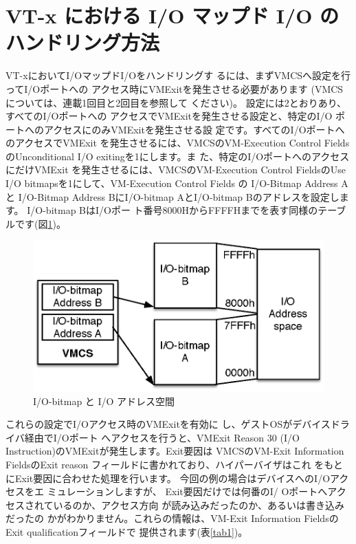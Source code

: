 \section{VT-x における I/O マップド I/O のハンドリング方法}

 VT-xにおいてI/OマップドI/Oをハンドリングす
るには、まずVMCSへ設定を行ってI/Oポートへの
アクセス時にVMExitを発生させる必要があります
(VMCSについては、連載1回目と2回目を参照して
ください)。
 設定には2とおりあり、すべてのI/Oポートへの
アクセスでVMExitを発生させる設定と、特定のI/O
ポートへのアクセスにのみVMExitを発生させる設
定です。すべてのI/OポートへのアクセスでVMExit
を発生させるには、VMCSのVM-Execution Control
FieldsのUnconditional I/O exitingを1にします。ま
た、特定のI/OポートへのアクセスにだけVMExit
を発生させるには、VMCSのVM-Execution Control
FieldsのUse I/O bitmapsを1にして、VM-Execution
Control Fields の I/O-Bitmap Address A と
I/O-Bitmap Address BにI/O-bitmap AとI/O-bitmap
Bのアドレスを設定します。 I/O-bitmap BはI/Oポー
ト番号8000HからFFFFHまでを表す同様のテーブルです(図\ref{fig1})。

\begin{figure}\centering
\includegraphics{figures/part3_fig1_IO_bitmaps.eps}
\caption{I/O-bitmap と I/O アドレス空間}
\label{fig1}
\end{figure}

 これらの設定でI/Oアクセス時のVMExitを有効に
し、ゲストOSがデバイスドライバ経由でI/Oポート
へアクセスを行うと、VMExit Reason 30 (I/O
Instruction)のVMExitが発生します。Exit要因は
VMCSのVM-Exit Information FieldsのExit reason
フィールドに書かれており、ハイパーバイザはこれ
をもとにExit要因に合わせた処理を行います。
 今回の例の場合はデバイスへのI/Oアクセスをエ
ミュレーションしますが、 Exit要因だけでは何番のI/
Oポートへアクセスされているのか、アクセス方向
が読み込みだったのか、あるいは書き込みだったの
かがわかりません。これらの情報は、VM-Exit
Information FieldsのExit qualificationフィールドで
提供されます(表\ref{tab1})。

